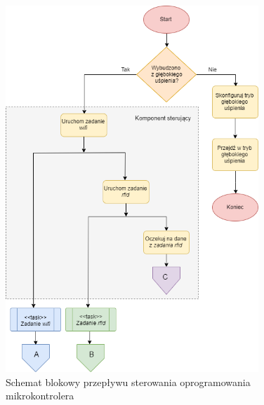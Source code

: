             \begin{figure}[]
                \centering
                \includegraphics[width=0.85\textwidth]{chapters/images/flowchart1.png}
                \caption{Schemat blokowy przepływu sterowania oprogramowania mikrokontrolera}
                \label{fig:flowchart1}
            \end{figure}

